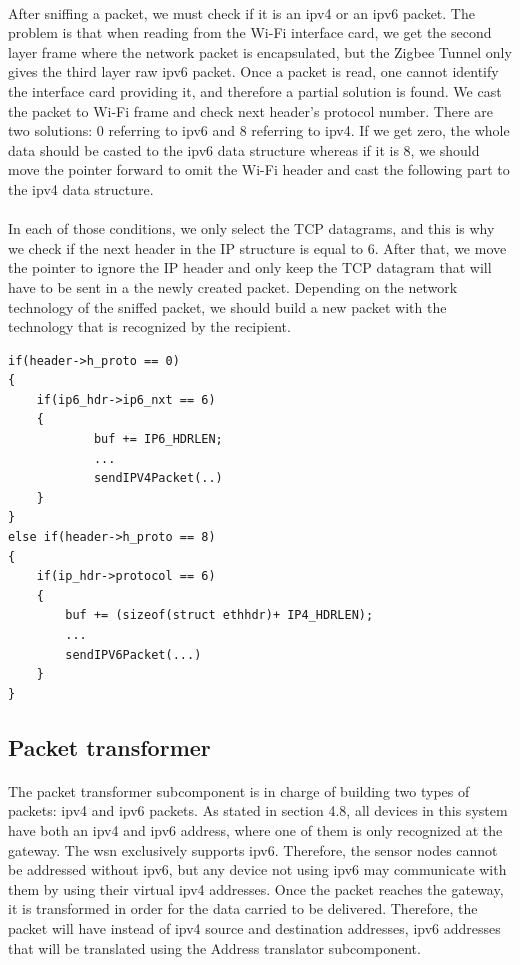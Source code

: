 \documentclass[oneside,12pt,a4paper,final]{book}
\begin{document}
\paragraph{}
After sniffing a packet, we must check if it is an \gls{ipv4} or an \gls{ipv6} packet. The problem is that when reading from the Wi-Fi interface card, we get the second layer frame where the network packet is encapsulated, but the Zigbee Tunnel only gives the third layer raw \gls{ipv6} packet. Once a packet is read, one cannot identify the interface card providing it, and therefore a partial solution is found. We cast the packet to Wi-Fi frame and check next header's protocol number. There are two solutions: 0 referring to \gls{ipv6} and 8 referring to \gls{ipv4}.
If we get zero, the whole data should be casted to the \gls{ipv6} data structure whereas if it is 8, we should move the pointer forward to omit the Wi-Fi header and cast the following part to the \gls{ipv4} data structure.
\paragraph{}
In each of those conditions, we only select the TCP datagrams, and this is why we check if the next header in the IP structure is equal to 6. After that, we move the pointer to ignore the IP header and only keep the TCP datagram that will have to be sent in a the newly created packet. Depending on the network technology of the sniffed packet, we should build a new packet with the technology that is recognized by the recipient.

\begin{lstlisting}
if(header->h_proto == 0) 
{
	if(ip6_hdr->ip6_nxt == 6)
	{
			buf += IP6_HDRLEN;
			... 			
			sendIPV4Packet(..)
	}
}
else if(header->h_proto == 8)
{
	if(ip_hdr->protocol == 6)
	{
		buf += (sizeof(struct ethhdr)+ IP4_HDRLEN);		
		...
		sendIPV6Packet(...)
	}
}
\end{lstlisting}

\subsection{Packet transformer}
\paragraph{}
The packet transformer subcomponent is in charge of building two types of packets: \gls{ipv4} and \gls{ipv6} packets. As stated in section 4.8, all devices in this system have both an \gls{ipv4} and \gls{ipv6} address, where one of them is only recognized at the gateway. The \gls{wsn} exclusively supports \gls{ipv6}. Therefore, the sensor nodes cannot be addressed without \gls{ipv6}, but any device not using \gls{ipv6} may communicate with them by using their virtual \gls{ipv4} addresses. Once the packet reaches the gateway, it is transformed in order for the data carried to be delivered. Therefore, the packet will have instead of \gls{ipv4} source and destination addresses, \gls{ipv6} addresses that will be translated using the Address translator subcomponent.
\end{document}
